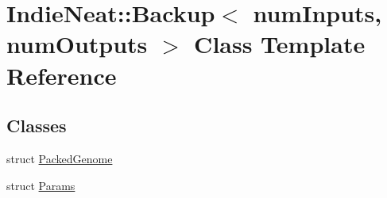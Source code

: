 \hypertarget{class_indie_neat_1_1_backup}{}\section{Indie\+Neat\+:\+:Backup$<$ num\+Inputs, num\+Outputs $>$ Class Template Reference}
\label{class_indie_neat_1_1_backup}
\subsection*{Classes}
\begin{DoxyCompactItemize}
\item 
struct \hyperlink{struct_indie_neat_1_1_backup_1_1_packed_genome}{Packed\+Genome}
\item 
struct \hyperlink{struct_indie_neat_1_1_backup_1_1_params}{Params}
\end{DoxyCompactItemize}

